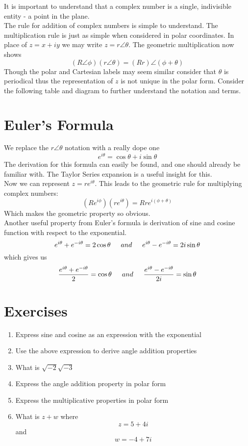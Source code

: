 		\indent It is important to understand that a complex number is a single, indivisible entity - a point in the plane. \\ \indent
		The rule for addition of complex numbers is simple to understand. The multiplication rule is just as simple when considered in polar coordinates. In place of $ z = x + iy $ we may write $ z = r \angle \theta $. The geometric multiplication now shows \[ (R \angle \phi) (r \angle \theta) = (Rr)\angle(\phi + \theta)  \] Though the polar and Cartesian labels may seem similar consider that $ \theta $ is periodical thus the representation of $ z $ is not unique in the polar form. 
		Consider the following table and diagram to further understand the notation and terms. 
\section{Euler's Formula}
		We replace the $ r \angle \theta $ notation with a really dope one 
		\[ e^{i\theta} = \cos \theta + i \sin \theta \] The derivation for this formula can easily be found, and one should already be familiar with. The Taylor Series expansion is a useful insight for this. \\Now we can represent $ z = re^{i \theta} $. This leads to the geometric rule for multiplying complex numbers: \[ (R e^{i \phi}) (r e^{i \theta}) = Rr e^{i(\phi + \theta)} \] Which makes the geometric property so obvious. \\
		Another useful property from Euler's formula is derivation of sine and cosine function with respect to the exponential. 
		\[ e^{i \theta}  + e^{-i \theta} = 2 \cos \theta \indent and \indent e^{i \theta}  - e^{-i \theta} = 2i \sin \theta\]
		which gives us
		\[ \dfrac{e^{i \theta}  + e^{-i \theta}}{2} = \cos \theta \indent and \indent \dfrac{e^{i \theta}  - e^{-i \theta}}{2i} = \sin \theta \]
\section{Exercises}
\begin{enumerate}
	\item Express sine and cosine as an expression with the exponential
	\item Use the above expression to derive angle addition properties
	\item What is $ \sqrt{-2}\sqrt{-3} $
	\item Express the angle addition property in polar form
	\item Express the multiplicative properties in polar form
	\item What is $ z + w $ where \[ z = 5 + 4i \] and \[ w = -4 + 7i \]
\end{enumerate}
\cleardoublepage


